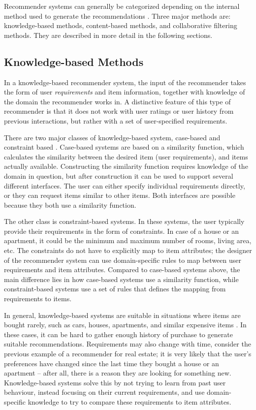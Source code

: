Recommender systems can generally be categorized depending on the internal method used to generate the recommendations \cite{aggarwal:2016}.
Three major methods are: knowledge-based methods, content-based methods, and collaborative filtering methods.
They are described in more detail in the following sections.

\subsection{Knowledge-based Methods}

In a knowledge-based recommender system, the input of the recommender takes the form of user \emph{requirements} and item information, together with knowledge of the domain the recommender works in.
A distinctive feature of this type of recommender is that it does not work with user ratings or user history from previous interactions, but rather with a set of user-specified requirements.

There are two major classes of knowledge-based system, case-based and constraint based \cite{ricci:2011}. 
Case-based systems are based on a similarity function, which calculates the similarity between the desired item (user requirements), and items actually available.
Constructing the similarity function requires knowledge of the domain in question, but after construction it can be used to support several different interfaces.
The user can either specify individual requirements directly, or they can request items similar to other items.
Both interfaces are possible because they both use a similarity function.

The other class is constraint-based systems.
In these systems, the user typically provide their requirements in the form of constraints.
In case of a house or an apartment, it could be the minimum and maximum number of rooms, living area, etc.
The constraints do not have to explicitly map to item attributes; the designer of the recommender system can use domain-specific rules to map between user requirements and item attributes.
Compared to case-based systems above, the main difference lies in how case-based systems use a similarity function, while constraint-based systems use a set of rules that defines the mapping from requirements to items.

In general, knowledge-based systems are suitable in situations where items are bought rarely, such as cars, houses, apartments, and similar expensive items \cite{aggarwal:2016}.
In these cases, it can be hard to gather enough history of purchase to generate suitable recommendations.
Requirements may also change with time, consider the previous example of a recommender for real estate; it is very likely that the user's preferences have changed since the last time they bought a house or an apartment -- after all, there is a reason they are looking for something new.
Knowledge-based systems solve this by not trying to learn from past user behaviour, instead focusing on their current requirements, and use domain-specific knowledge to try to compare these requirements to item attributes.

